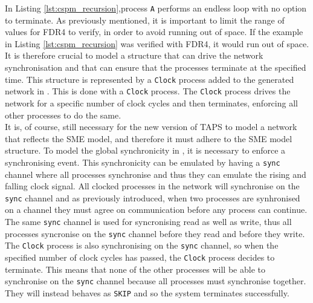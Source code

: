 In Listing \ref{lst:cspm_recursion},process \texttt{A} performs an endless loop with no option to terminate. As previously mentioned, it is important to limit the range of values for FDR4 to verify, in order to avoid running out of space. If the example in Listing \ref{lst:cspm_recursion} was verified with FDR4, it would run out of space. It is therefore crucial to model a structure that can drive the network synchronisation and that can ensure that the processes terminate at the specified time. This structure is represented by a \texttt{Clock} process added to the generated network in \cspm{}.
This is done with a \texttt{Clock} process. The \texttt{Clock} process drives the network for a specific number of clock cycles and then terminates, enforcing all other processes to do the same. \\

It is, of course, still necessary for the new version of TAPS to model a \cspm{} network that reflects the SME model, and therefore it must adhere to the SME model structure. To model the global synchronicity in \cspm{}, it is necessary to enforce a synchronising event. This synchronicity can be emulated by having a \texttt{sync} channel where all processes synchronise and thus they can emulate the rising and falling clock signal. All clocked processes in the network will synchronise on the \texttt{sync} channel and as previously introduced, when two processes are synhronised on a channel they must agree on communication before any process can continue. The same \texttt{sync} channel is used for syncronising read as well as write, thus all processes syncronise on the \texttt{sync} channel before they read and before they write.
The \texttt{Clock} process is also synchronising on the \texttt{sync} channel, so when the specified number of clock cycles has passed, the \texttt{Clock} process decides to terminate.
This means that none of the other processes will be able to synchronise on the \texttt{sync} channel because all processes must synchronise together. They will instead behaves as \texttt{SKIP} and so the system terminates successfully.\\

